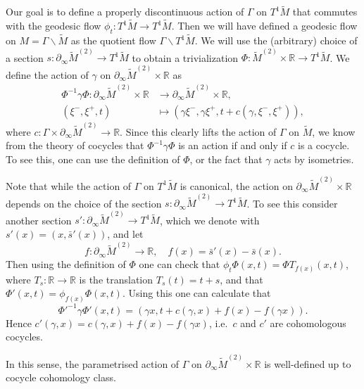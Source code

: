 \documentclass{report}
\begin{document}
Our goal is to define a properly discontinuous action of $\Gamma$ on $T^1 \tilde M$ that commutes with the geodesic flow $\phi_t: T^1 \tilde M \to T^1 \tilde M$.
Then we will have defined a geodesic flow on $M = \Gamma \backslash \tilde M$ as the quotient flow $\Gamma \backslash T^1 \tilde M$.
We will use the (arbitrary) choice of a section $s: \partial_\infty \tilde M^{(2)} \to T^1 \tilde M$ to obtain a trivialization $\Phi: \tilde M^{(2)} \times \mathbb R \to T^1 \tilde M$.
We define the action of $\gamma$ on $\partial_\infty \tilde M^{(2)} \times \mathbb R$ as
\begin{align*}
    \Phi^{-1} \gamma \Phi: \partial_\infty \tilde M^{(2)} \times \mathbb R &\to \partial_\infty \tilde M^{(2)} \times \mathbb R,\\
    (\xi^-, \xi^+, t) &\mapsto (\gamma \xi^-, \gamma \xi^+, t + c(\gamma, \xi^-, \xi^+)),
\end{align*}
where $c: \Gamma \times \partial_\infty \tilde M^{(2)} \to \mathbb R$.
Since this clearly lifts the action of $\Gamma$ on $\tilde M$, we know from the theory of cocycles that $\Phi^{-1} \gamma \Phi$ is an action if and only if $c$ is a cocycle.
To see this, one can use the definition of $\Phi$, or the fact that $\gamma$ acts by isometries.
\begin{remark}
    Note that while the action of $\Gamma$ on $T^1 \tilde M$ is canonical, the action on $\partial_\infty \tilde M^{(2)} \times \mathbb R$ depends on the choice of the section $s: \partial_\infty \tilde M^{(2)} \to T^1 \tilde M$.
    To see this consider another section $s': \partial_\infty \tilde M^{(2)} \to T^1 \tilde M$, which we denote with $s'(x) = (x, \bar s'(x))$, and let
    \[
    f: \partial_\infty \tilde M^{(2)} \to \mathbb R, \quad f(x) = \bar s'(x) - \bar s(x).
    \]
    Then using the definition of $\Phi$ one can check that $\phi_t \Phi(x,t) = \Phi T_{f(x)}(x,t)$, where $T_s: \mathbb R \to \mathbb R$ is the translation $T_s(t) = t + s$, and that $\Phi'(x,t) = \phi_{f(x)} \Phi(x,t)$.
    Using this one can calculate that
    \[
    \Phi'^{-1} \gamma \Phi'(x,t) = ( \gamma x, t + c(\gamma, x) + f(x) - f(\gamma x)).
    \]
    Hence $c'(\gamma, x) = c(\gamma, x) + f(x) - f(\gamma x)$, i.e.\ $c$ and $c'$ are cohomologous cocycles.

    In this sense, the parametrised action of $\Gamma$ on $\partial_\infty \tilde M^{(2)} \times \mathbb R$ is well-defined up to cocycle cohomology class.
\end{remark}
\end{document}
